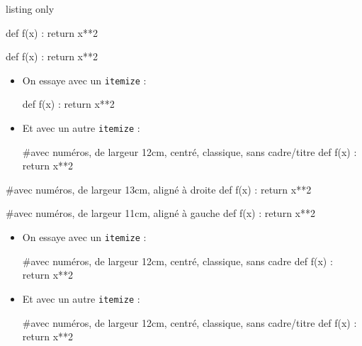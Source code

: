 \documentclass[a4paper,french,11pt]{article}
\begin{document}
\begin{PresCodeTexPL}{listing only}
\begin{CodePiton}[Alignement=flush right,Largeur=13cm]{}
def f(x) :
	return x**2
\end{CodePiton}

\begin{CodePiton}[Alignement=flush left,Largeur=11cm]{}
def f(x) :
	return x**2
\end{CodePiton}

\begin{itemize} %
	\item On essaye avec un \texttt{itemize} :
	\begin{CodePiton}[Largeur=12cm,Style=Classique,Cadre=false]{}
		def f(x) :
			return x**2
	\end{CodePiton}
	\item Et avec un autre \texttt{itemize} :
	\begin{CodePiton}[Largeur=12cm,Style=Classique,Cadre=false,BarreTitre=false]{}
		#avec numéros, de largeur 12cm, centré, classique, sans cadre/titre
		def f(x) :
			return x**2
	\end{CodePiton}
\end{itemize}
\vspace*{-\baselineskip}\leavevmode
\end{PresCodeTexPL}

\begin{CodePiton}[Alignement=flush right,Largeur=13cm]{}
#avec numéros, de largeur 13cm, aligné à droite
def f(x) :
	return x**2
\end{CodePiton}

\begin{CodePiton}[Alignement=flush left,Largeur=11cm]{}
#avec numéros, de largeur 11cm, aligné à gauche
def f(x) :
	return x**2
\end{CodePiton}

\begin{itemize}
	\item On essaye avec un \texttt{itemize} :
	\begin{CodePiton}[Largeur=12cm,Style=Classique,Cadre=false]{}
		#avec numéros, de largeur 12cm, centré, classique, sans cadre
		def f(x) :
			return x**2
	\end{CodePiton}
	\item Et avec un autre \texttt{itemize} :
	\begin{CodePiton}[Largeur=12cm,Style=Classique,BarreTitre=false,Cadre=false]{}
		#avec numéros, de largeur 12cm, centré, classique, sans cadre/titre
		def f(x) :
			return x**2
	\end{CodePiton}
\end{itemize}
\end{document}
